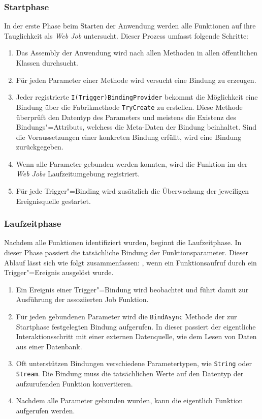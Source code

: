 \subsubsection{Startphase}

In der erste Phase beim Starten der Anwendung werden alle Funktionen auf ihre Tauglichkeit als \textit{Web Job} untersucht. Dieser Prozess umfasst folgende Schritte:

\begin{enumerate}
	\item Das Assembly der Anwendung wird nach allen Methoden in allen öffentlichen Klassen durchsucht.
	\item Für jeden Parameter einer Methode wird versucht eine Bindung zu erzeugen.
	\item Jeder registrierte \lstinline{I(Trigger)BindingProvider} bekommt die Möglichkeit eine Bindung über die Fabrikmethode \lstinline{TryCreate} zu erstellen. Diese Methode überprüft den Datentyp des Parameters und meistens die Existenz des Bindungs"=Attributs, welchess die Meta-Daten der Bindung beinhaltet. Sind die Voraussetzungen einer konkreten Bindung erfüllt, wird eine Bindung zurückgegeben.
	\item Wenn alle Parameter gebunden werden konnten, wird die Funktion im der \textit{Web Jobs} Laufzeitumgebung registriert.
	\item Für jede Trigger"=Binding wird zusätzlich die Überwachung der jeweiligen Ereignisquelle gestartet.
\end{enumerate}

\subsubsection{Laufzeitphase}

Nachdem alle Funktionen identifiziert wurden, beginnt die Laufzeitphase. In dieser Phase passiert die tatsächliche Bindung der Funktionsparameter. Dieser Ablauf lässt sich wie folgt zusammenfassen:
, wenn ein Funktionsaufruf durch ein Trigger"=Ereignis ausgelöst wurde.

\begin{enumerate}
	\item Ein Ereignis einer Trigger"=Bindung wird beobachtet und führt damit zur Ausführung der assoziierten Job Funktion.
	\item Für jeden gebundenen Parameter wird die \lstinline{BindAsync} Methode der zur Startphase festgelegten Bindung aufgerufen. In dieser passiert der eigentliche Interaktionsschritt mit einer externen Datenquelle, wie \zB dem Lesen von Daten aus einer Datenbank.
	\item Oft unterstützen Bindungen verschiedene Parametertypen, wie \zB \lstinline{String} oder \lstinline{Stream}. Die Bindung muss die tatsächlichen Werte auf den Datentyp der aufzurufenden Funktion konvertieren.
	\item Nachdem alle Parameter gebunden wurden, kann die eigentlich Funktion aufgerufen werden.
\end{enumerate}


